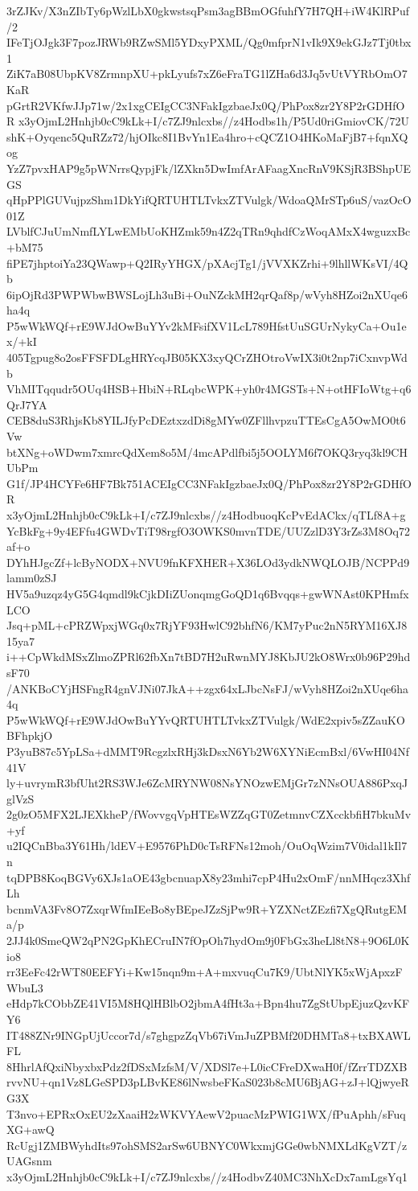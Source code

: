3rZJKv/X3nZIbTy6pWzlLbX0gkwstsqPsm3agBBmOGfuhfY7H7QH+iW4KlRPuf/2
IFeTjOJgk3F7pozJRWb9RZwSMl5YDxyPXML/Qg0mfprN1vIk9X9ekGJz7Tj0tbx1
ZiK7aB08UbpKV8ZrmnpXU+pkLyufs7xZ6eFraTG1lZHa6d3Jq5vUtVYRbOmO7KaR
pGrtR2VKfwJJp71w/2x1xgCEIgCC3NFakIgzbaeJx0Q/PhPox8zr2Y8P2rGDHfOR
x3yOjmL2Hnhjb0cC9kLk+I/c7ZJ9nlcxbs//z4Hodbs1h/P5Ud0riGmiovCK/72U
shK+Oyqenc5QuRZz72/hjOIkc8I1BvYn1Ea4hro+cQCZ1O4HKoMaFjB7+fqnXQog
YzZ7pvxHAP9g5pWNrrsQypjFk/lZXkn5DwImfArAFaagXncRnV9KSjR3BShpUEGS
qHpPPlGUVujpzShm1DkYifQRTUHTLTvkxZTVulgk/WdoaQMrSTp6uS/vazOcO01Z
LVblfCJuUmNmfLYLwEMbUoKHZmk59n4Z2qTRn9qhdfCzWoqAMxX4wguzxBc+bM75
fiPE7jhptoiYa23QWawp+Q2IRyYHGX/pXAcjTg1/jVVXKZrhi+9lhllWKsVI/4Qb
6ipOjRd3PWPWbwBWSLojLh3uBi+OuNZckMH2qrQaf8p/wVyh8HZoi2nXUqe6ha4q
P5wWkWQf+rE9WJdOwBuYYv2kMFsifXV1LcL789HfstUuSGUrNykyCa+Ou1ex/+kI
405Tgpug8o2osFFSFDLgHRYcqJB05KX3xyQCrZHOtroVwIX3i0t2np7iCxnvpWdb
VhMITqqudr5OUq4HSB+HbiN+RLqbcWPK+yh0r4MGSTs+N+otHFIoWtg+q6QrJ7YA
CEB8duS3RhjsKb8YILJfyPcDEztxzdDi8gMYw0ZFllhvpzuTTEsCgA5OwMO0t6Vw
btXNg+oWDwm7xmrcQdXem8o5M/4mcAPdlfbi5j5OOLYM6f7OKQ3ryq3kl9CHUbPm
G1f/JP4HCYFe6HF7Bk751ACEIgCC3NFakIgzbaeJx0Q/PhPox8zr2Y8P2rGDHfOR
x3yOjmL2Hnhjb0cC9kLk+I/c7ZJ9nlcxbs//z4HodbuoqKcPvEdACkx/qTLf8A+g
YcBkFg+9y4EFfu4GWDvTiT98rgfO3OWKS0mvnTDE/UUZzlD3Y3rZs3M8Oq72af+o
DYhHJgcZf+lcByNODX+NVU9fnKFXHER+X36LOd3ydkNWQLOJB/NCPPd9lamm0zSJ
HV5a9uzqz4yG5G4qmdl9kCjkDIiZUonqmgGoQD1q6Bvqqs+gwWNAst0KPHmfxLCO
Jsq+pML+cPRZWpxjWGq0x7RjYF93HwlC92bhfN6/KM7yPuc2nN5RYM16XJ815ya7
i++CpWkdMSxZlmoZPRl62fbXn7tBD7H2uRwnMYJ8KbJU2kO8Wrx0b96P29hdsF70
/ANKBoCYjHSFngR4gnVJNi07JkA++zgx64xLJbcNsFJ/wVyh8HZoi2nXUqe6ha4q
P5wWkWQf+rE9WJdOwBuYYvQRTUHTLTvkxZTVulgk/WdE2xpiv5sZZauKOBFhpkjO
P3yuB87c5YpLSa+dMMT9RcgzlxRHj3kDsxN6Yb2W6XYNiEcmBxl/6VwHI04Nf41V
ly+uvrymR3bfUht2RS3WJe6ZcMRYNW08NsYNOzwEMjGr7zNNsOUA886PxqJglVzS
2g0zO5MFX2LJEXkheP/fWovvgqVpHTEsWZZqGT0ZetmnvCZXcckbfiH7bkuMv+yf
u2IQCnBba3Y61Hh/ldEV+E9576PhD0cTsRFNs12moh/OuOqWzim7V0idal1kIl7n
tqDPB8KoqBGVy6XJs1aOE43gbcnuapX8y23mhi7cpP4Hu2xOmF/nnMHqcz3XhfLh
bcnmVA3Fv8O7ZxqrWfmIEeBo8yBEpeJZzSjPw9R+YZXNctZEzfi7XgQRutgEMa/p
2JJ4k0SmeQW2qPN2GpKhECruIN7fOpOh7hydOm9j0FbGx3heLl8tN8+9O6L0Kio8
rr3EeFc42rWT80EEFYi+Kw15nqn9m+A+mxvuqCu7K9/UbtNlYK5xWjApxzFWbuL3
eHdp7kCObbZE41VI5M8HQlHBlbO2jbmA4fHt3a+Bpn4hu7ZgStUbpEjuzQzvKFY6
IT488ZNr9INGpUjUccor7d/s7ghgpzZqVb67iVmJuZPBMf20DHMTa8+txBXAWLFL
8HhrlAfQxiNbyxbxPdz2fDSxMzfsM/V/XDSl7e+L0icCFreDXwaH0f/fZrrTDZXB
rvvNU+qn1Vz8LGeSPD3pLBvKE86lNwsbeFKaS023b8cMU6BjAG+zJ+lQjwyeRG3X
T3nvo+EPRxOxEU2zXaaiH2zWKVYAewV2puacMzPWIG1WX/fPuAphh/sFuqXG+awQ
RcUgj1ZMBWyhdIts97ohSMS2arSw6UBNYC0WkxmjGGe0wbNMXLdKgVZT/zUAGsnm
x3yOjmL2Hnhjb0cC9kLk+I/c7ZJ9nlcxbs//z4HodbvZ40MC3NhXcDx7amLgsYq1
